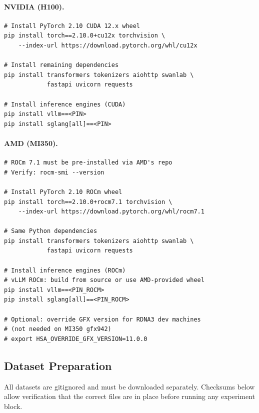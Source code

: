 \paragraph{NVIDIA (H100).}

\begin{verbatim}
# Install PyTorch 2.10 CUDA 12.x wheel
pip install torch==2.10.0+cu12x torchvision \
    --index-url https://download.pytorch.org/whl/cu12x

# Install remaining dependencies
pip install transformers tokenizers aiohttp swanlab \
            fastapi uvicorn requests

# Install inference engines (CUDA)
pip install vllm==<PIN>
pip install sglang[all]==<PIN>
\end{verbatim}

\paragraph{AMD (MI350).}

\begin{verbatim}
# ROCm 7.1 must be pre-installed via AMD's repo
# Verify: rocm-smi --version

# Install PyTorch 2.10 ROCm wheel
pip install torch==2.10.0+rocm7.1 torchvision \
    --index-url https://download.pytorch.org/whl/rocm7.1

# Same Python dependencies
pip install transformers tokenizers aiohttp swanlab \
            fastapi uvicorn requests

# Install inference engines (ROCm)
# vLLM ROCm: build from source or use AMD-provided wheel
pip install vllm==<PIN_ROCM>
pip install sglang[all]==<PIN_ROCM>

# Optional: override GFX version for RDNA3 dev machines
# (not needed on MI350 gfx942)
# export HSA_OVERRIDE_GFX_VERSION=11.0.0
\end{verbatim}

\subsection{Dataset Preparation}
\label{sec:appendix:datasets}

All datasets are gitignored and must be downloaded separately.  Checksums
below allow verification that the correct files are in place before running
any experiment block.

